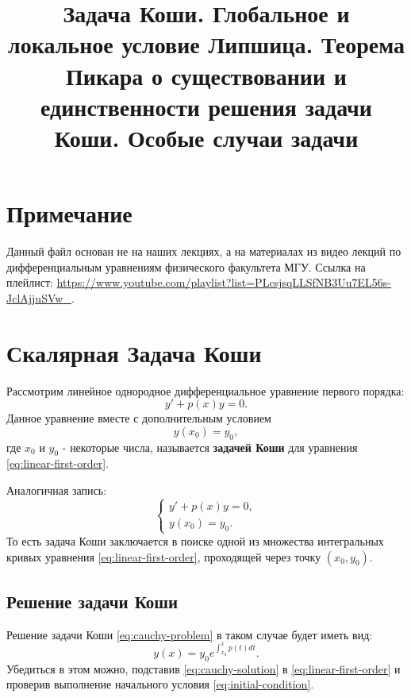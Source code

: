 \documentclass[12pt]{article}
\title{Задача Коши. Глобальное и локальное условие Липшица. Теорема Пикара о существовании и единственности решения задачи Коши. Особые случаи задачи }
\begin{document}
\maketitle

\section{Примечание}
Данный файл основан не на наших лекциях, а на материалах из видео лекций
по дифференциальным уравнениям физического факультета МГУ. Ссылка на
плейлист: \url{https://www.youtube.com/playlist?list=PLcsjsqLLSfNB3Uu7EL56s-JclAjjuSVw_}.

\section{Скалярная Задача Коши}

Рассмотрим линейное однородное дифференциальное уравнение первого порядка:
\begin{equation}\label{eq:linear-first-order}
    y' + p(x)y = 0.
\end{equation}
Данное уравнение вместе с дополнительным условием
\begin{equation}\label{eq:initial-condition}
    y(x_0) = y_0,
\end{equation}
где $x_0$ и $y_0$ - некоторые числа, называется \textbf{задачей Коши}
для уравнения \eqref{eq:linear-first-order}.

Аналогичная запись:
\begin{equation}\label{eq:cauchy-problem}
    \begin{cases}
        y' + p(x)y = 0, \\
        y(x_0) = y_0.
    \end{cases}
\end{equation}
То есть задача Коши заключается в поиске одной из множества интегральных кривых уравнения \eqref{eq:linear-first-order},
проходящей через точку $(x_0, y_0)$.

\subsection{Решение задачи Коши}
Решение задачи Коши \eqref{eq:cauchy-problem} в таком случае будет иметь вид:
\begin{equation}\label{eq:cauchy-solution}
    y(x) = y_0 e^{\int_{x_0}^{x} p(t) dt}.
\end{equation}
Убедиться в этом можно, подставив \eqref{eq:cauchy-solution}
в \eqref{eq:linear-first-order} и проверив выполнение
начального условия \eqref{eq:initial-condition}.
\end{document}
